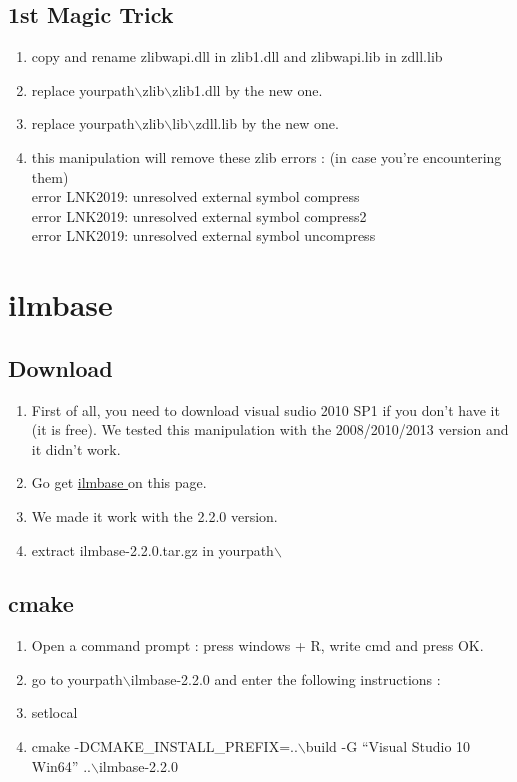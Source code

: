 \documentclass{beamer}
\begin{document}
\subsection{1st Magic Trick}
\begin{frame}
  \begin{enumerate}
    \item copy and rename zlibwapi.dll in zlib1.dll and zlibwapi.lib in zdll.lib
    \item replace yourpath$\backslash$zlib$\backslash$zlib1.dll by the new one.
    \item replace yourpath$\backslash$zlib$\backslash$lib$\backslash$zdll.lib by the new one.
    \item this manipulation will remove these zlib errors : (in case you're encountering them) \\
    error LNK2019: unresolved external symbol compress \\
    error LNK2019: unresolved external symbol compress2 \\
    error LNK2019: unresolved external symbol uncompress
  \end{enumerate}
\end{frame}

\section{ilmbase}
\subsection{Download}
\begin{frame}
  \begin{enumerate}
    \item First of all, you need to download visual sudio 2010 SP1 if you don't have it (it is free). We tested this manipulation with the 2008/2010/2013 version and it didn't work.
    \item Go get \color{blue}\href{http://www.openexr.com/downloads.html/}{ilmbase }\color{black} on this page.
    \item We made it work with the 2.2.0 version.
    \item extract ilmbase-2.2.0.tar.gz in yourpath$\backslash$
  \end{enumerate}
\end{frame}

\subsection{cmake}
\begin{frame}
  \begin{enumerate}
    \item Open a command prompt : press windows + R, write cmd and press OK.
    \item go to yourpath$\backslash$ilmbase-2.2.0 and enter the following instructions :
    \item setlocal
    \item cmake -DCMAKE\_INSTALL\_PREFIX=..$\backslash$build -G ``Visual Studio 10 Win64'' ..$\backslash$ilmbase-2.2.0
  \end{enumerate}
\end{frame}
\end{document}
